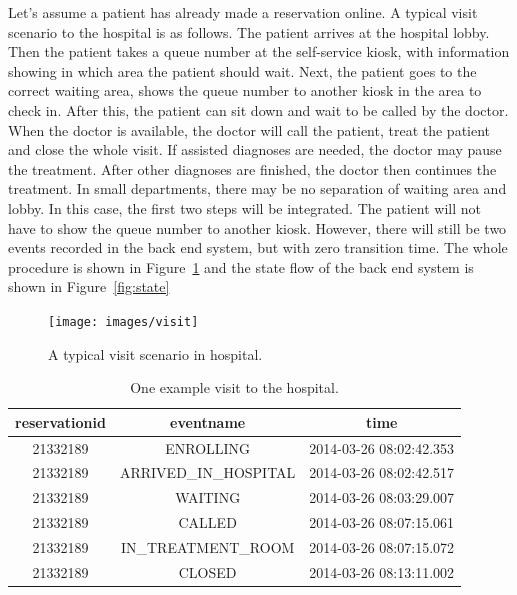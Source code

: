 Let's assume a patient has already made a reservation online. A typical visit scenario to the hospital is as follows. The patient arrives at the hospital lobby. Then the patient takes a queue number at the self-service kiosk, with information showing in which area the patient should wait. Next, the patient goes to the correct waiting area, shows the queue number to another kiosk in the area to check in. After this, the patient can sit down and wait to be called by the doctor. When the doctor is available, the doctor will call the patient, treat the patient and close the whole visit. If assisted diagnoses are needed, the doctor may pause the treatment. After other diagnoses are finished, the doctor then continues the treatment. In small departments, there may be no separation of waiting area and lobby. In this case, the first two steps will be integrated. The patient will not have to show the queue number to another kiosk. However, there will still be two events recorded in the back end system, but with zero transition time. The whole procedure is shown in Figure~\ref{fig:visit} and the state flow of the back end system is shown in Figure~\ref{fig:state}

\begin{figure}
	\begin{center}
		\texttt{[image: images/visit]}
		\caption{A typical visit scenario in hospital.}
		\label{fig:visit}
	\end{center}
\end{figure}

\begin{table}
	\caption{One example visit to the hospital.}
	\label{table:example}
	\begin{center}
	\begin{tabular}{|c|c|c|}
		\hline
		 reservationid &      eventname      &          time	\\ \hline

	      21332189 & ENROLLING           & 2014-03-26 08:02:42.353	\\ \hline
	      21332189 & ARRIVED\_IN\_HOSPITAL & 2014-03-26 08:02:42.517	\\ \hline
    	  21332189 & WAITING             & 2014-03-26 08:03:29.007	\\ \hline
	      21332189 & CALLED              & 2014-03-26 08:07:15.061	\\ \hline
    	  21332189 & IN\_TREATMENT\_ROOM   & 2014-03-26 08:07:15.072	\\ \hline
	      21332189 & CLOSED              & 2014-03-26 08:13:11.002	\\ \hline
	\end{tabular}
	\end{center}
	
\end{table}

